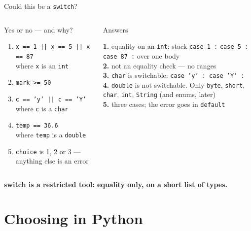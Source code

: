 \documentclass[aspectratio=169]{beamer}
\newcommand{\keyline}[1]{\vfill\begin{center}\textcolor{bkblue}{\textbf{#1}}\end{center}\vspace*{0.2em}}
\newcommand{\code}[1]{\texttt{#1}}
\newcommand{\yes}{\textcolor{goodgreen}{\ding{51}}}
\newcommand{\no}{\textcolor{badred}{\ding{55}}}
\begin{document}
\begin{frame}[fragile]{Could this be a \texttt{switch}?}
  \begin{columns}[T,onlytextwidth]
    \begin{discussionbox}{Yes or no --- and why?}
      \small
      \begin{enumerate}[itemsep=0.35em, leftmargin=1.3em]
        \item \code{x == 1 || x == 5 || x == 87}\\ where \code{x} is an \code{int}
        \item \code{mark >= 50}
        \item \code{c == 'y' || c == 'Y'}\\ where \code{c} is a \code{char}
        \item \code{temp == 36.6}\\ where \code{temp} is a \code{double}
        \item \code{choice} is 1, 2 or 3 --- anything else is an error
      \end{enumerate}
    \end{discussionbox}
    \pause
    \begin{contextbox}{Answers}
      \small\raggedright
      \textbf{1.} \yes{} equality on an \code{int}: stack \code{case 1 :}
      \code{case 5 :} \code{case 87 :} over one body\\[0.25em]
      \textbf{2.} \no{} not an equality check --- no ranges\\[0.25em]
      \textbf{3.} \yes{} \code{char} is switchable: \code{case 'y' : case 'Y' :}\\[0.25em]
      \textbf{4.} \no{} \code{double} is not switchable. Only \code{byte}, \code{short},
      \code{char}, \code{int}, \code{String} (and enums, later)\\[0.25em]
      \textbf{5.} \yes{} three cases; the error goes in \code{default}
    \end{contextbox}
  \end{columns}
  \keyline{switch is a restricted tool: equality only, on a short list of types.}
\end{frame}

\section{Choosing in Python}
\end{document}
